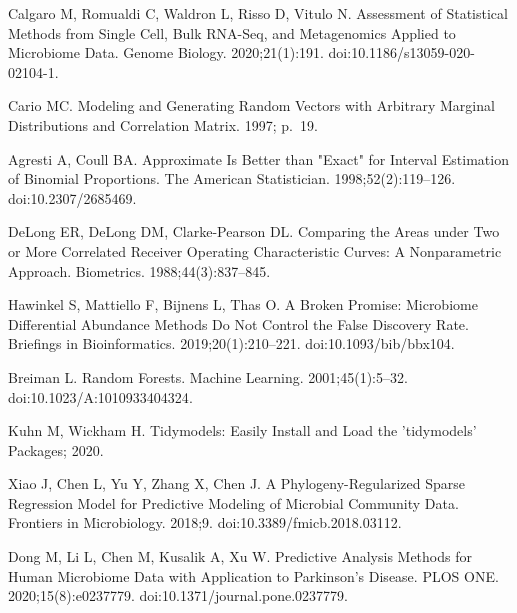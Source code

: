 \documentclass[10pt,letterpaper]{article}
\begin{document}
\begin{thebibliography}{10}
    Calgaro M, Romualdi C, Waldron L, Risso D, Vitulo N.
    \newblock Assessment of Statistical Methods from Single Cell, Bulk {{RNA}}-Seq,
      and Metagenomics Applied to Microbiome Data.
    \newblock Genome Biology. 2020;21(1):191.
    \newblock doi:{10.1186/s13059-020-02104-1}.
    
    Cario MC.
    \newblock Modeling and {{Generating Random Vectors}} with {{Arbitrary Marginal
      Distributions}} and {{Correlation Matrix}}. 1997; p.~19.
    
    Agresti A, Coull BA.
    \newblock Approximate {{Is Better}} than "{{Exact}}" for {{Interval
      Estimation}} of {{Binomial Proportions}}.
    \newblock The American Statistician. 1998;52(2):119--126.
    \newblock doi:{10.2307/2685469}.
    
    DeLong ER, DeLong DM, {Clarke-Pearson} DL.
    \newblock Comparing the Areas under Two or More Correlated Receiver Operating
      Characteristic Curves: A Nonparametric Approach.
    \newblock Biometrics. 1988;44(3):837--845.
    
    Hawinkel S, Mattiello F, Bijnens L, Thas O.
    \newblock A Broken Promise: Microbiome Differential Abundance Methods Do Not
      Control the False Discovery Rate.
    \newblock Briefings in Bioinformatics. 2019;20(1):210--221.
    \newblock doi:{10.1093/bib/bbx104}.
    
    Breiman L.
    \newblock Random {{Forests}}.
    \newblock Machine Learning. 2001;45(1):5--32.
    \newblock doi:{10.1023/A:1010933404324}.
    
    Kuhn M, Wickham H.
    \newblock Tidymodels: {{Easily}} Install and Load the 'tidymodels' Packages;
      2020.
    
    Xiao J, Chen L, Yu Y, Zhang X, Chen J.
    \newblock A {{Phylogeny}}-{{Regularized Sparse Regression Model}} for
      {{Predictive Modeling}} of {{Microbial Community Data}}.
    \newblock Frontiers in Microbiology. 2018;9.
    \newblock doi:{10.3389/fmicb.2018.03112}.
    
    Dong M, Li L, Chen M, Kusalik A, Xu W.
    \newblock Predictive Analysis Methods for Human Microbiome Data with
      Application to {{Parkinson}}'s Disease.
    \newblock PLOS ONE. 2020;15(8):e0237779.
    \newblock doi:{10.1371/journal.pone.0237779}.
    

\end{thebibliography}
\end{document}
